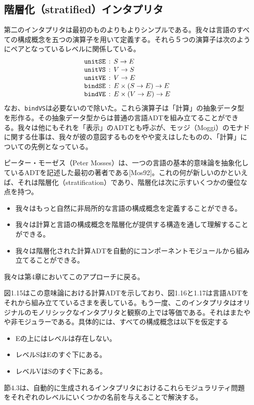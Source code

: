 \documentclass[11pt, oneside]{jsbook}   	%
\begin{document}



\subsection{階層化（stratified）インタプリタ}
第二のインタプリタは最初のものよりもよりシンプルである。我々は言語のすべての構成概念を五つの演算子を用いて定義する。それら５つの演算子は次のようにペアとなっているレベルに関係している。
$$
\begin{array}{l}
\verb|unitSE| \,:\, S \rightarrow E\\
\verb|unitVS| \,:\, V \rightarrow S\\
\verb|unitVE| \,:\, V \rightarrow E\\
\verb|bindSE| \,:\, E \times (S \rightarrow E) \rightarrow E\\
\verb|bindVE| \,:\, E \times (V \rightarrow E) \rightarrow E
\end{array}
$$
なお、\verb|bindVS|は必要ないので除いた。これら演算子は「計算」の抽象データ型を形作る。その抽象データ型からは普通の言語ADTを組み立てることができる。我々は他にもそれを「表示」のADTとも呼ぶが、モッジ（Moggi）のモナドに関する仕事は、我々が彼の意図するものをやや変えはしたものの、「計算」についての先例となっている。

ピーター・モーゼス（Peter Mosses）は、一つの言語の基本的意味論を抽象化しているADTを記述した最初の著者である[Mos92]。これの何が新しいのかといえば、それは階層化（stratification）であり、階層化は次に示すいくつかの優位な点を持つ。
\begin{itemize}
\item 我々はもっと自然に非局所的な言語の構成概念を定義することができる。
\end{itemize}
\newpage

\newpage

\newpage
\begin{itemize}
\item 我々は計算と言語の構成概念を階層化が提供する構造を通して理解することができる。
\item 我々は階層化された計算ADTを自動的にコンポーネントモジュールから組み立てることができる。
\end{itemize}
我々は第4章においてこのアプローチに戻る。

図1.15はこの意味論における計算ADTを示しており、図1.16と1.17は言語ADTをそれから組み立てているさまを表している。もう一度、このインタプリタはオリジナルのモノリシックなインタプリタと観察の上では等価である。それはまたやや非モジュラーである。具体的には、すべての構成概念は以下を仮定する
\begin{itemize}
\item Eの上にはレベルは存在しない。
\item レベルSはEのすぐ下にある。
\item レベルVはSのすぐ下にある。
\end{itemize}
節4.3は、自動的に生成されるインタプリタにおけるこれらモジュラリティ問題をそれぞれのレベルにいくつかの名前を与えることで解決する。
\end{document}
